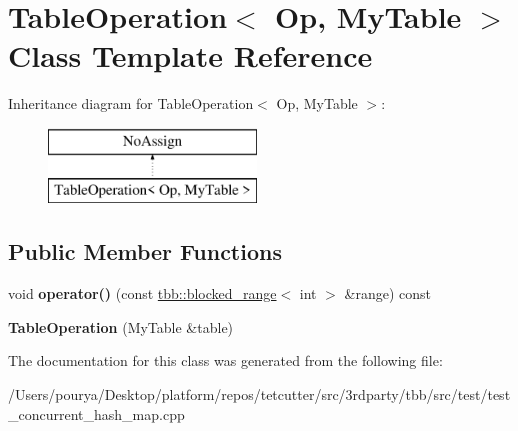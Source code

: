 \hypertarget{classTableOperation}{}\section{Table\+Operation$<$ Op, My\+Table $>$ Class Template Reference}
\label{classTableOperation}
Inheritance diagram for Table\+Operation$<$ Op, My\+Table $>$\+:\begin{figure}[H]
\begin{center}
\leavevmode
\includegraphics[height=2.000000cm]{classTableOperation}
\end{center}
\end{figure}
\subsection*{Public Member Functions}
\begin{DoxyCompactItemize}
\item 
\hypertarget{classTableOperation_a5d696d497ec72232f243899d56888410}{}void {\bfseries operator()} (const \hyperlink{classtbb_1_1blocked__range}{tbb\+::blocked\+\_\+range}$<$ int $>$ \&range) const \label{classTableOperation_a5d696d497ec72232f243899d56888410}

\item 
\hypertarget{classTableOperation_a38df62aa3fc1e1941f5e6152f9ed7fc1}{}{\bfseries Table\+Operation} (My\+Table \&table)\label{classTableOperation_a38df62aa3fc1e1941f5e6152f9ed7fc1}

\end{DoxyCompactItemize}


The documentation for this class was generated from the following file\+:\begin{DoxyCompactItemize}
\item 
/\+Users/pourya/\+Desktop/platform/repos/tetcutter/src/3rdparty/tbb/src/test/test\+\_\+concurrent\+\_\+hash\+\_\+map.\+cpp\end{DoxyCompactItemize}
